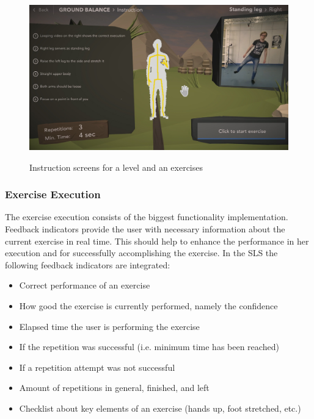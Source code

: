 \begin{figure}[htb]
\begin{minipage}[t]{0.32\linewidth}
		\label{fig:jumpline}
	\end{minipage}
	\hfill
	\begin{minipage}[t]{0.32\linewidth}
		\centering
		\includegraphics[width=1\linewidth]{Pictures/5_Workflow/10_ExerciseInstruction}
		\label{fig:rodeoline}
	\end{minipage}
	\caption{Instruction screens for a level and an exercises}%
	\label{fig:slacklineVariation}
\end{figure}

\subsubsection{Exercise Execution}
The exercise execution consists of the biggest functionality implementation. Feedback indicators provide the user with necessary information about the current exercise in real time. This should help to enhance the performance in her execution and for successfully accomplishing the exercise. In the SLS the following feedback indicators are integrated:

\begin{itemize}
\item Correct performance of an exercise
\item How good the exercise is currently performed, namely the confidence
\item Elapsed time the user is performing the exercise
\item If the repetition was successful (i.e. minimum time has been reached)
\item If a repetition attempt was not successful
\item Amount of repetitions in general, finished, and left
\item Checklist about key elements of an exercise (hands up, foot stretched, etc.)
\end{itemize}

